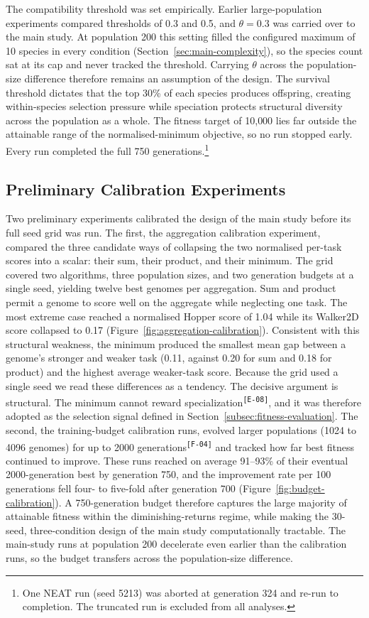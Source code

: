 \documentclass[12pt]{article}
\newcommand{\revID}[1]{\textsuperscript{\scriptsize\texttt{[#1]}}}
\newcommand{\revBrit}[2]{\textcolor{lrBlue}{#2}\revID{#1}}      %
\newcommand{\revFig}[2]{\textcolor{lrAmber}{#2}\revID{#1}}      %
\begin{document}
The compatibility threshold was set empirically.
Earlier large-population experiments compared thresholds of 0.3 and 0.5, and $\theta = 0.3$ was carried over to the main study.
At population 200 this setting filled the configured maximum of 10 species in every condition (Section~\ref{sec:main-complexity}), so the species count sat at its cap and never tracked the threshold. Carrying $\theta$ across the population-size difference therefore remains an assumption of the design.
The survival threshold dictates that the top 30\% of each species produces offspring, creating within-species selection pressure while speciation protects structural diversity across the population as a whole.
The fitness target of 10{,}000 lies far outside the attainable range of the normalised-minimum objective, so no run stopped early. Every run completed the full 750 generations.\footnote{One NEAT run (seed 5213) was aborted at generation 324 and re-run to completion. The truncated run is excluded from all analyses.}

\subsection{Preliminary Calibration Experiments}
\label{subsec:calibration}

Two preliminary experiments calibrated the design of the main study before its full seed grid was run.
The first, the aggregation calibration experiment, compared the three candidate ways of collapsing the two normalised per-task scores into a scalar: their sum, their product, and their minimum.
The grid covered two algorithms, three population sizes, and two generation budgets at a single seed, yielding twelve best genomes per aggregation.
Sum and product permit a genome to score well on the aggregate while neglecting one task. The most extreme case reached a normalised Hopper score of 1.04 while its Walker2D score collapsed to 0.17 (Figure~\ref{fig:aggregation-calibration}).
Consistent with this structural weakness, the minimum produced the smallest mean gap between a genome's stronger and weaker task (0.11, against 0.20 for sum and 0.18 for product) and the highest average weaker-task score.
Because the grid used a single seed we read these differences as a tendency. The decisive argument is structural.
\revBrit{E-08}{The minimum cannot reward specialization}, and it was therefore adopted as the selection signal defined in Section~\ref{subsec:fitness-evaluation}.
The second, the training-budget calibration runs, evolved larger populations \revFig{F-04}{(1024 to 4096 genomes) for up to 2000 generations} and tracked how far best fitness continued to improve.
These runs reached on average 91--93\% of their eventual 2000-generation best by generation 750, and the improvement rate per 100 generations fell four- to five-fold after generation 700 (Figure~\ref{fig:budget-calibration}).
A 750-generation budget therefore captures the large majority of attainable fitness within the diminishing-returns regime, while making the 30-seed, three-condition design of the main study computationally tractable.
The main-study runs at population 200 decelerate even earlier than the calibration runs, so the budget transfers across the population-size difference.
\end{document}
